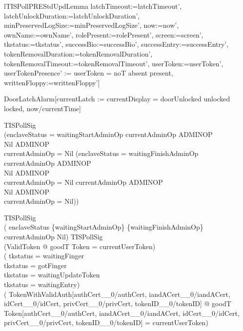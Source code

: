 \begin{theorem}{lTISPollPREStdUpdLemma}
                        latchTimeout:=latchTimeout',
                        latchUnlockDuration:=latchUnlockDuration',
                        minPreservedLogSize:=minPreservedLogSize', now:=now',
                        ownName:=ownName', rolePresent:=rolePresent',
                        screen:=screen', tkstatus:=tkstatus', successBio:=successBio',
                        successEntry:=successEntry',
                        tokenRemovalDuration:=tokenRemovalDuration',
                        tokenRemovalTimeout:=tokenRemovalTimeout',
                        userToken:=userToken',
                        userTokenPresence'
                          := \IF userToken = noT \THEN absent \ELSE present,
                        writtenFloppy:=writtenFloppy']
\end{theorem}

DoorLatchAlarm[currentLatch
                          := \IF currentDisplay = doorUnlocked
                             \THEN unlocked
                             \ELSE locked, now/currentTime]

 TISPollSig \\
\implies (\IF enclaveStatus = waitingStartAdminOp
          \THEN       currentAdminOp \in \power ADMINOP \\
                \land Nil \in \power ADMINOP \\
                \land \lnot currentAdminOp = Nil
          \ELSE (\IF enclaveStatus = waitingFinishAdminOp
                 \THEN       currentAdminOp \in \power ADMINOP \\
                       \land Nil \in \power ADMINOP \\
                       \land \lnot currentAdminOp = Nil
                 \ELSE                currentAdminOp \in \power ADMINOP \\
                                \land Nil \in \power ADMINOP \\
                       \implies currentAdminOp = Nil))

 TISPollSig \\
\implies (     enclaveStatus
               \in \{waitingStartAdminOp\} \cup \{waitingFinishAdminOp\} \\
          \iff currentAdminOp \neq Nil)
   TISPollSig \\
         \land
          \lnot (\exists ValidToken @ goodT \theta Token = currentUserToken) \\
         \land (     tkstatus = waitingFinger \\
                \lor tkstatus = gotFinger \\
                \lor tkstatus = waitingUpdateToken \\
                \lor tkstatus = waitingEntry) \\
\implies
 (\exists
    TokenWithValidAuth[authCert\_\_0/authCert, iandACert\_\_0/iandACert,
                       idCert\_\_0/idCert, privCert\_\_0/privCert,
                       tokenID\_\_0/tokenID]
    @ goodT
      \theta
        Token[authCert\_\_0/authCert, iandACert\_\_0/iandACert,
              idCert\_\_0/idCert, privCert\_\_0/privCert, tokenID\_\_0/tokenID]
      = currentUserToken)

